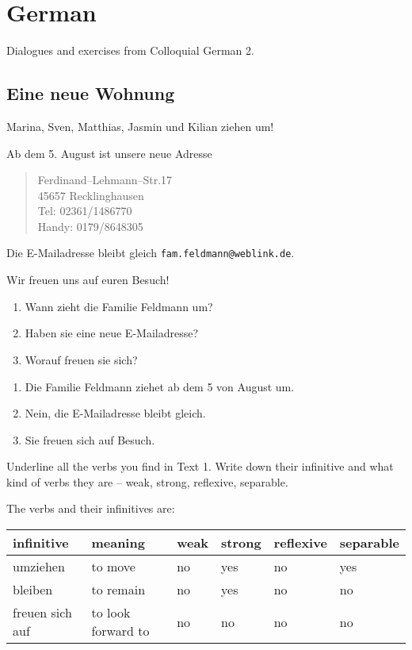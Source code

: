 \chapter{German}
Dialogues and exercises from Colloquial German 2.

\section{Eine neue Wohnung}

\begin{exercise}[Text]
Marina, Sven, Matthias, Jasmin und Kilian ziehen um!

Ab dem 5. August ist unsere neue Adresse
\begin{quote}
  Ferdinand--Lehmann--Str.\@ 17\\
  45657 Recklinghausen\\
  Tel: 02361/1486770\\
  Handy: 0179/8648305
\end{quote}
Die E-Mailadresse bleibt gleich \texttt{fam.feldmann@weblink.de}.

Wir freuen uns auf euren Besuch!
\end{exercise}

\begin{exercise}
  \hfill
  \begin{enumerate}[label=\arabic*.]
  \item Wann zieht die Familie Feldmann um?
  \item Haben sie eine neue E-Mailadresse?
  \item Worauf freuen sie sich?
  \end{enumerate}
\end{exercise}
\begin{solution}\hfill
  \begin{enumerate}[label=\arabic*.]
  \item Die Familie Feldmann ziehet ab dem 5 von August um.
  \item Nein, die E-Mailadresse bleibt gleich.
  \item Sie freuen sich auf Besuch.
  \end{enumerate}
\end{solution}

\begin{exercise}
  Underline all the verbs you find in Text 1. Write down their infinitive
  and what kind of verbs they are -- weak, strong, reflexive, separable.
\end{exercise}
\begin{solution}
  The verbs and their infinitives are:
  \begin{center}
  \begin{tabular}{|l|l|l|l|l|l|}
    \hline
    infinitive&meaning&weak&strong&reflexive&separable\\
    \hline
    umziehen&to move&no&yes&no&yes\\
    bleiben&to remain&no&yes&no&no\\
    freuen sich auf&to look forward to&no&no&no&no\\
    \hline
  \end{tabular}
  \end{center}
\end{solution}

